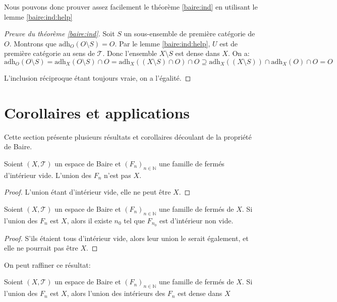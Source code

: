 Nous pouvons donc prouver assez facilement le théorème \ref{baire:ind} en utilisant
le lemme \ref{baire:ind:help}

\begin{proof}[Preuve du théorème \ref{baire:ind}]
  Soit $S$ un sous-ensemble de première catégorie de $O$.
  Montrons que $\mathrm{adh}_O(O\setminus S) = O$.
  Par le lemme \ref{baire:ind:help}, $U$ est de première
  catégorie au sens de $\mathcal{T}$. Donc l'ensemble $X\setminus
  S$ est dense dans $X$. On a:
  $$\mathrm{adh}_O(O\setminus S) = \mathrm{adh}_X(O\setminus S)\cap O
  = \mathrm{adh}_X((X\setminus S)\cap O)\cap O\supseteq
  \mathrm{adh}_X((X\setminus S)) \cap \mathrm{adh}_X(O)\cap O = O$$

  L'inclusion réciproque étant toujours vraie, on a l'égalité.
\end{proof}

\section{Corollaires et applications}
Cette section présente plusieurs résultats et corollaires
découlant de la propriété de Baire.

\begin{prop}
  Soient $(X, \mathcal{T})$ un espace de Baire et $(F_n)_{n\in\mathbb N}$
  une famille de fermés d'intérieur vide. L'union des $F_n$ n'est pas
  $X$.
\end{prop}
\begin{proof}
  L'union étant d'intérieur vide, elle ne peut être $X$.
\end{proof}

\begin{prop}\label{baire:cor:intf}
  Soient $(X, \mathcal{T})$ un espace de Baire et $(F_n)_{n\in\mathbb N}$
  une famille de fermés de $X$. Si l'union des $F_n$ est $X$,
  alors il existe $n_0$ tel que $F_{n_0}$ est d'intérieur non vide.
\end{prop}
\begin{proof}
  S'ils étaient tous d'intérieur vide, alors leur union le serait également,
  et elle ne pourrait pas être $X$.
\end{proof}

On peut raffiner ce résultat:
\begin{prop}
  Soient $(X, \mathcal{T})$ un espace de Baire et $(F_n)_{n\in\mathbb N}$
  une famille de fermés de $X$. Si l'union des $F_n$ est $X$,
  alors l'union des intérieurs des $F_n$ est dense dans $X$
\end{prop}

